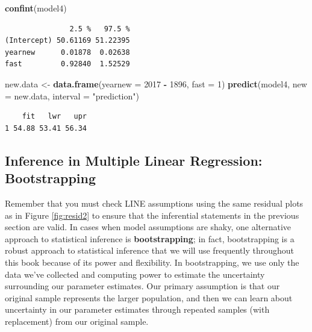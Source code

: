 \documentclass[
]{krantz}
\newenvironment{Shaded}{\begin{snugshade}}{\end{snugshade}}
\newcommand{\DataTypeTok}[1]{\textcolor[rgb]{0.27,0.27,0.27}{#1}}
\newcommand{\DecValTok}[1]{\textcolor[rgb]{0.06,0.06,0.06}{#1}}
\newcommand{\KeywordTok}[1]{\textcolor[rgb]{0.27,0.27,0.27}{\textbf{#1}}}
\newcommand{\NormalTok}[1]{#1}
\newcommand{\OperatorTok}[1]{\textcolor[rgb]{0.43,0.43,0.43}{\textbf{#1}}}
\newcommand{\StringTok}[1]{\textcolor[rgb]{0.5,0.5,0.5}{#1}}
\begin{document}
\begin{Shaded}
\begin{Highlighting}[]
\KeywordTok{confint}\NormalTok{(model4)}
\end{Highlighting}
\end{Shaded}

\begin{verbatim}
               2.5 %   97.5 %
(Intercept) 50.61169 51.22395
yearnew      0.01878  0.02638
fast         0.92840  1.52529
\end{verbatim}

\begin{Shaded}
\begin{Highlighting}[]
\NormalTok{new.data <-}\StringTok{ }\KeywordTok{data.frame}\NormalTok{(}\DataTypeTok{yearnew =} \DecValTok{2017} \OperatorTok{-}\StringTok{ }\DecValTok{1896}\NormalTok{, }\DataTypeTok{fast =} \DecValTok{1}\NormalTok{) }
\KeywordTok{predict}\NormalTok{(model4, }\DataTypeTok{new =}\NormalTok{ new.data, }\DataTypeTok{interval =} \StringTok{"prediction"}\NormalTok{)}
\end{Highlighting}
\end{Shaded}

\begin{verbatim}
    fit   lwr   upr
1 54.88 53.41 56.34
\end{verbatim}

\hypertarget{multreg-boot}{%
\subsection{Inference in Multiple Linear Regression: Bootstrapping}\label{multreg-boot}}

Remember that you must check LINE assumptions using the same residual plots as in Figure \ref{fig:resid2} to ensure that the inferential statements in the previous section are valid. In cases when model assumptions are shaky, one alternative approach to statistical inference is \textbf{bootstrapping};  in fact, bootstrapping is a robust approach to statistical inference that we will use frequently throughout this book because of its power and flexibility. In bootstrapping, we use only the data we've collected and computing power to estimate the uncertainty surrounding our parameter estimates. Our primary assumption is that our original sample represents the larger population, and then we can learn about uncertainty in our parameter estimates through repeated samples (with replacement) from our original sample.
\end{document}
